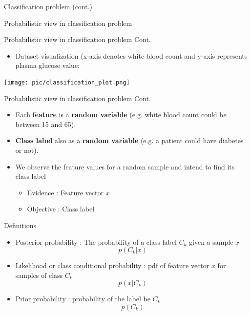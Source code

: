 \documentclass[serif, aspectratio=169]{beamer}
\begin{document}
\begin{frame}{Classification problem (cont.)}
\begin{itemize}
\begin{frame}{Probabilistic view in classification problem}
\end{frame}
\begin{frame}{Probabilistic view in classification problem Cont.}
    \begin{itemize}
        \item Dataset visualization (x-axis denotes white blood count and y-axis represents plasma glucose value:
    \end{itemize}
    \begin{center}
        \texttt{[image: pic/classification\_plot.png]}
    \end{center}
\end{frame}

\begin{frame}{Probabilistic view in classification problem Cont.}
    \begin{itemize}
        \item Each \textbf{feature} is a \textbf{random variable} (e.g. white blood count could be between 15 and 65).
        \item \textbf{Class label} also as a \textbf{random variable} (e.g. a patient could have diabetes or not).
        \item We observe the feature values for a random sample and intend to find its class label
            \begin{itemize}
                \item Evidence : Feature vector $x$
                \item Objective : Class label
            \end{itemize}
    \end{itemize}
\end{frame}
\begin{frame}{Definitions}
    \begin{itemize}
        \item Posterior probability : The probability of a class label $C_k$ given a sample $x$
            \[
                p(C_k|x)
            \]
            
        \item Likelihood or class conditional probability : pdf of feature vector $x$ for samples of class $C_k$
            \[
                 p(x|C_k)
            \]
        
        \item Prior probability : probability of the label be $C_k$ 
            \[
                p(C_k)
            \]
            

\end{itemize}
\end{frame}
\end{itemize}
\end{frame}
\end{document}
